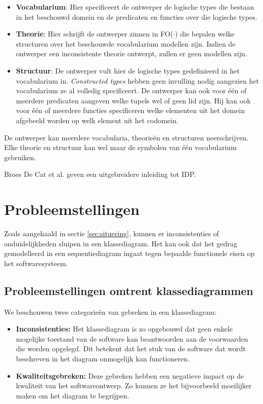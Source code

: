 \begin{itemize}
	\item \textbf{Vocabularium}: Hier specificeert de ontwerper de logische types die bestaan in het beschouwd domein en de predicaten en functies over die logische types.
	\item \textbf{Theorie}: Hier schrijft de ontwerper zinnen in FO($\cdot$) die bepalen welke structuren over het beschouwde vocabularium modellen zijn. Indien de ontwerper een inconsistente theorie ontwerpt, zullen er geen modellen zijn.
	\item \textbf{Structuur}: De ontwerper vult hier de logische types gedefinieerd in het vocabularium in. \textit{Constructed types} hebben geen invulling nodig aangezien het vocabularium ze al volledig specificeert. De ontwerper kan ook voor \'e\'en of meerdere predicaten aangeven welke tupels wel of geen lid zijn. Hij kan ook voor \'e\'en of meerdere functies specificeren welke elementen uit het domein afgebeeld worden op welk element uit het codomein.
\end{itemize}

De ontwerper kan meerdere vocabularia, theorie\"en en structuren neerschrijven. Elke theorie en structuur kan wel maar de symbolen van \'e\'en vocabularium gebruiken.

Broes De Cat et al.\cite{DeCatBroes2014PLaa} geven een uitgebreidere inleiding tot IDP.

\section{Probleemstellingen}\label{sec:research-q}

Zoals aangehaald in sectie \ref{sec:situering}, kunnen er inconsistenties of onduidelijkheden sluipen in een klassediagram. Het kan ook dat het gedrag gemodelleerd in een sequentiediagram ingaat tegen bepaalde functionele eisen op het softwaresysteem.

\subsection{Probleemstellingen omtrent klassediagrammen}

We beschouwen twee categorie\"en van gebreken in een klassediagram:

\begin{itemize}
	\item \textbf{Inconsistenties:} Het klassediagram is zo opgebouwd dat geen enkele mogelijke toestand van de software kan beantwoorden aan de voorwaarden die worden opgelegd. Dit betekent dat het stuk van de software dat wordt beschreven in het diagram onmogelijk kan functioneren.
	\item \textbf{Kwaliteitsgebreken:} Deze gebreken hebben een negatieve impact op de kwaliteit van het softwareontwerp. Zo kunnen ze het bijvoorbeeld moeilijker maken om het diagram te begrijpen.
\end{itemize}

